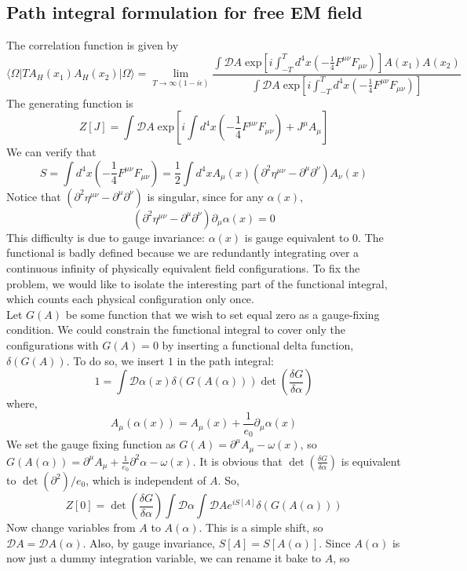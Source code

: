 \documentclass[cyan]{elegantnote}
\begin{document}
\subsection{Path integral formulation for free EM field}
\noindent
The correlation function is given by
\[\langle \Omega | T A_H(x_1) A_H(x_2)| \Omega \rangle = \lim_{T \to \infty(1-i\epsilon)} \frac{\int \mathcal{D}A \; \mathrm{exp} \left[ i\int_{-T}^T d^4x (-\frac{1}{4} F^{\mu\nu}F_{\mu\nu}) \right] A(x_1) A(x_2)}{\int \mathcal{D}A \; \mathrm{exp} \left[ i\int_{-T}^T d^4x (-\frac{1}{4} F^{\mu\nu}F_{\mu\nu}) \right]}\]
The generating function is 
\[Z[J] = \int \mathcal{D}A \; \mathrm{exp} \left[ i\int d^4x (-\frac{1}{4} F^{\mu\nu}F_{\mu\nu}) + J^{\mu} A_{\mu} \right]\]
We can verify that
\[S = \int d^4x (-\frac{1}{4} F^{\mu\nu}F_{\mu\nu}) = \frac{1}{2} \int d^4x A_{\mu}(x) (\partial^2\eta^{\mu\nu} - \partial^{\mu}\partial^{\nu})A_{\nu}(x)\]
Notice that $(\partial^2\eta^{\mu\nu} - \partial^{\mu}\partial^{\nu})$ is singular, since for any $\alpha(x)$, 
\[(\partial^2\eta^{\mu\nu} - \partial^{\mu}\partial^{\nu})\partial_{\mu}\alpha(x) = 0\]
This difficulty is due to gauge invariance: $\alpha(x)$ is gauge equivalent to $0$. The functional is badly defined because we are redundantly integrating over a continuous infinity of physically equivalent field configurations. To fix the problem, we would like to isolate the interesting part of the functional integral, which counts each physical configuration only once. \\
Let $G(A)$ be some function that we wish to set equal zero as a gauge-fixing condition. We could constrain the functional integral to cover only the configurations with $G(A) = 0$ by inserting a functional delta function, $\delta(G(A))$. To do so, we insert $1$ in the path integral:
\[ 1 = \int \mathcal{D}\alpha(x) \delta(G(A(\alpha))) \det \left( \frac{\delta G}{\delta \alpha} \right)\]
where,
\[A_{\mu}(\alpha(x)) = A_{\mu}(x) + \frac{1}{e_0}\partial_{\mu}\alpha(x)\]
We set the gauge fixing function as $G(A) = \partial^{\mu} A_{\mu} -\omega(x)$, so $G(A(\alpha)) = \partial^{\mu} A_{\mu} + \frac{1}{e_0}\partial^2 \alpha - \omega(x)$. It is obvious that $\det \left( \frac{\delta G}{\delta \alpha} \right)$ is equivalent to $\det(\partial^2)/e_0$, which is independent of $A$. So,
\[Z[0] = \det \left( \frac{\delta G}{\delta \alpha} \right) \int \mathcal{D}\alpha \int \mathcal{D}A e^{iS[A]} \delta(G(A(\alpha)))\]
Now change variables from $A$ to $A(\alpha)$. This is a simple shift, so $\mathcal{D}A = \mathcal{D}A(\alpha)$. Also, by gauge invariance, $S[A] = S[A(\alpha)]$. Since $A(\alpha)$ is now just a dummy integration variable, we can rename it bake to $A$, so
\end{document}

